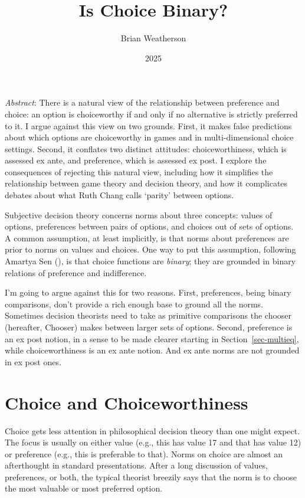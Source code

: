 \documentclass[
  11pt,
  letterpaper,
  DIV=11,
  numbers=noendperiod,
  twoside]{scrartcl}
\title{Is Choice Binary?}
\author{Brian Weatherson}
\date{2025}
\renewenvironment{abstract}
 {\vspace{-1.25cm}
 \quotation\small\noindent\emph{Abstract}:}
 {\endquotation}
\begin{document}
\maketitle
\begin{abstract}
There is a natural view of the relationship between preference and
choice: an option is choiceworthy if and only if no alternative is
strictly preferred to it. I argue against this view on two grounds.
First, it makes false predictions about which options are choiceworthy
in games and in multi-dimensional choice settings. Second, it conflates
two distinct attitudes: choiceworthiness, which is assessed ex ante, and
preference, which is assessed ex post. I explore the consequences of
rejecting this natural view, including how it simplifies the
relationship between game theory and decision theory, and how it
complicates debates about what Ruth Chang calls `parity' between
options.
\end{abstract}


Subjective decision theory concerns norms about three concepts: values
of options, preferences between pairs of options, and choices out of
sets of options. A common assumption, at least implicitly, is that norms
about preferences are prior to norms on values and choices. One way to
put this assumption, following Amartya Sen
(), is that choice functions
are \emph{binary}; they are grounded in binary relations of preference
and indifference.

I'm going to argue against this for two reasons. First, preferences,
being binary comparisons, don't provide a rich enough base to ground all
the norms. Sometimes decision theorists need to take as primitive
comparisons the chooser (hereafter, Chooser) makes between larger sets
of options. Second, preference is an ex post notion, in a sense to be
made clearer starting in Section~\ref{sec-multieq}, while
choiceworthiness is an ex ante notion. And ex ante norms are not
grounded in ex post ones.

\section{Choice and Choiceworthiness}\label{sec-choice}

Choice gets less attention in philosophical decision theory than one
might expect. The focus is usually on either value (e.g., this has value
17 and that has value 12) or preference (e.g., this is preferable to
that). Norms on choice are almost an afterthought in standard
presentations. After a long discussion of values, preferences, or both,
the typical theorist breezily says that the norm is to choose the most
valuable or most preferred option.
\end{document}
